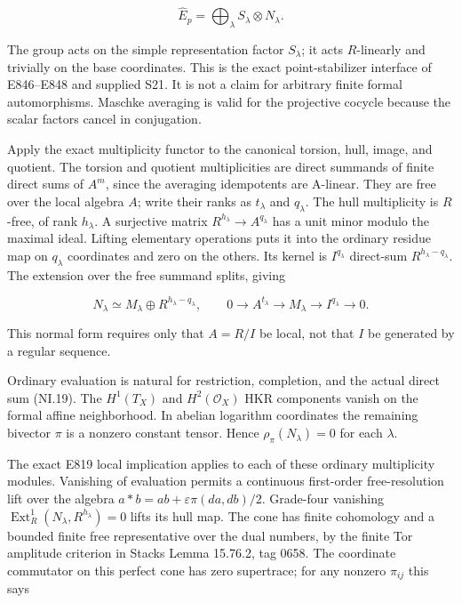 \[
 \widehat E_p=\bigoplus_\lambda S_\lambda\otimes N_\lambda.
 \tag{NI.19}
\]

The group acts on the simple representation factor \(S_{\lambda}\);
it acts \(R\)-linearly and trivially on the base coordinates.
This is the exact point-stabilizer interface of E846--E848 and
supplied S21. It is not a claim for arbitrary finite formal
automorphisms. Maschke averaging is valid for the projective
cocycle because the scalar factors cancel in conjugation.

Apply the exact multiplicity functor to the canonical torsion,
hull, image, and quotient. The torsion and quotient multiplicities
are direct summands of finite direct sums of \(A^m\), since the
averaging idempotents are A-linear. They are free over the local
algebra \(A\); write their ranks as \(t_{\lambda}\) and \(q_{\lambda}\). The hull
multiplicity is \(R\)-free, of rank \(h_{\lambda}\). A surjective matrix
\(R^{h_{\lambda}}\to A^{q_{\lambda}}\) has a unit minor modulo the maximal
ideal. Lifting elementary operations puts it into the ordinary
residue map on \(q_{\lambda}\) coordinates and zero on the others.
Its kernel is \(I^{q_{\lambda}}\) direct-sum \(R^{h_{\lambda}-q_{\lambda}}\).
The extension over the free summand splits, giving

\[
 N_\lambda\simeq M_\lambda\oplus R^{h_\lambda-q_\lambda},
 \qquad
 0\longrightarrow A^{t_\lambda}\longrightarrow M_\lambda
       \longrightarrow I^{q_\lambda}\longrightarrow0.
 \tag{NI.20}
\]

This normal form requires only that \(A=R/I\) be local, not that \(I\)
be generated by a regular sequence.

Ordinary evaluation is natural for restriction, completion, and
the actual direct sum (NI.19). The \(H^1(T_X)\) and \(H^2(\mathcal O_X)\) HKR
components vanish on the formal affine neighborhood. In abelian
logarithm coordinates the remaining bivector \(\pi\) is a nonzero
constant tensor. Hence \(\rho_{\pi}(N_{\lambda})=0\) for each \(\lambda\).

The exact E819 local implication applies to each of these
ordinary multiplicity modules. Vanishing of evaluation permits
a continuous first-order free-resolution lift over the algebra
\(a*b=ab+\varepsilon\pi(da,db)/2\). Grade-four vanishing
\(\operatorname{Ext}^1_R(N_{\lambda},R^{h_{\lambda}})=0\) lifts its hull map. The cone
has finite cohomology and a bounded finite free representative
over the dual numbers, by the finite Tor amplitude criterion
in Stacks Lemma 15.76.2, tag 0658.\cite{SF-StacksPerfect} The coordinate commutator on
this perfect cone has zero supertrace; for any nonzero \(\pi_{ij}\)
this says

